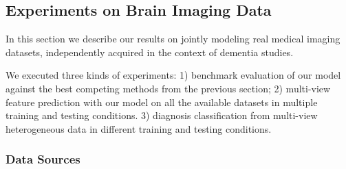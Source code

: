 \subsection{Experiments on Brain Imaging Data}
\label{sec:real}

% 
% 
% 

% 
In this section we describe our results on jointly modeling real medical imaging datasets, independently acquired in the context of dementia studies.

We executed three kinds of experiments:
1) benchmark evaluation of our model against the best competing methods from the previous section;
2) multi-view feature prediction with our model on all the available datasets in multiple training and testing conditions.
3) diagnosis classification from multi-view heterogeneous data in different training and testing conditions.

\subsubsection{Data Sources}
\label{ssec:datasets}

